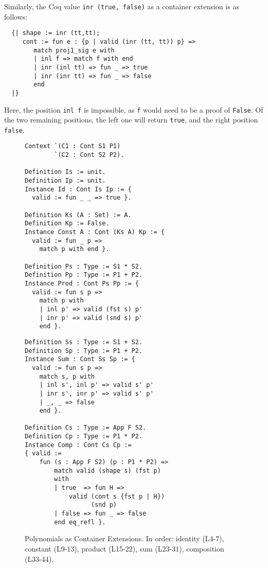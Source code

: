 \documentclass[a4paper, UKenglish, cleveref, autoref, thm-restate]{lipics-v2021}
\begin{document}
Similarly, the Coq value \texttt{inr (true, false)} as a container
extension is as follows:
\begin{verbatim}
  {| shape := inr (tt,tt);
     cont := fun e : {p | valid (inr (tt, tt)) p} =>
        match proj1_sig e with
        | inl f => match f with end
        | inr (inl tt) => fun _ => true
        | inr (inr tt) => fun _ => false
        end
  |}
\end{verbatim}
Here, the position \texttt{inl f} is impossible, as
\texttt{f} would need to be a proof of \texttt{False}.
Of the two remaining positions, the left one will return 
\texttt{true}, and the right position \texttt{false}.
\begin{figure}
\begin{minipage}{.52\textwidth}
  \begin{verbatim}
Context `(C1 : Cont S1 P1) 
        `(C2 : Cont S2 P2).

Definition Is := unit.
Definition Ip := unit.
Instance Id : Cont Is Ip := {
  valid := fun _ _ => true }.

Definition Ks (A : Set) := A.
Definition Kp := False.
Instance Const A : Cont (Ks A) Kp := {
  valid := fun _ p =>
    match p with end }.

Definition Ps : Type := S1 * S2.
Definition Pp : Type := P1 + P2.
Instance Prod : Cont Ps Pp := {
  valid := fun s p => 
    match p with
    | inl p' => valid (fst s) p'
    | inr p' => valid (snd s) p'
    end }.
\end{verbatim}
\end{minipage}
\begin{minipage}{.47\textwidth}
  \begin{verbatim}
Definition Ss : Type := S1 + S2.
Definition Sp : Type := P1 + P2.
Instance Sum : Cont Ss Sp := {
  valid := fun s p => 
    match s, p with
    | inl s', inl p' => valid s' p'
    | inr s', inr p' => valid s' p'
    | _, _ => false
    end }.

Definition Cs : Type := App F S2.
Definition Cp : Type := P1 * P2.
Instance Comp : Cont Cs Cp := 
{ valid :=  
    fun (s : App F S2) (p : P1 * P2) =>
        match valid (shape s) (fst p) 
        with
        | true  => fun H =>
            valid (cont s {fst p | H}) 
                  (snd p)
        | false => fun _ => false
        end eq_refl }.
  \end{verbatim}
\end{minipage}
  \caption{Polynomials as Container Extensions. In order: identity (L4-7),
  constant (L9-13), product (L15-22), sum (L23-31), composition (L33-44).}
  \label{fig:poly}
\end{figure}
\end{document}
